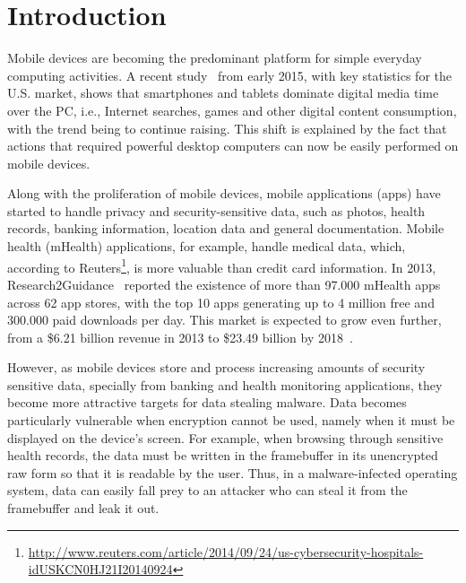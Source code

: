 
% 
% 
\section{Introduction}


Mobile devices are becoming the predominant platform for simple everyday computing activities.  A recent study~\cite{comscore} from early 2015, with key statistics for the U.S. market, shows that smartphones and tablets dominate digital media time over the \ac{PC}, i.e., Internet searches, games and other digital content consumption, with the trend being to continue raising. This shift is explained by the fact that actions that required powerful desktop computers can now be easily performed on mobile devices.

Along with the proliferation of mobile devices, mobile applications (apps) have started to handle privacy and security-sensitive data, such as photos, health records, banking information, location data and general documentation. Mobile health (mHealth) applications, for example, handle medical data, which, according to Reuters\footnote{\url{http://www.reuters.com/article/2014/09/24/us-cybersecurity-hospitals-idUSKCN0HJ21I20140924}}, is more valuable than credit card information. In 2013, Research2Guidance~\cite{research2guidance} reported the existence of more than 97.000 mHealth apps across 62 app stores, with the top 10 apps generating up to 4 million free and 300.000 paid downloads per day. This market is expected to grow even further, from a \$6.21 billion revenue in 2013 to \$23.49 billion by 2018~\cite{marketsandmarkets}.

However, as mobile devices store and process increasing amounts of security sensitive data, specially from banking and health monitoring applications, they become more attractive targets for data stealing malware. Data becomes particularly vulnerable when encryption cannot be used, namely when it must be displayed on the device's screen. For example, when browsing through sensitive health records, the data must be written in the framebuffer in its unencrypted raw form so that it is readable by the user. Thus, in a malware-infected operating system, data can easily fall prey to an attacker who can steal it from the framebuffer and leak it out.

